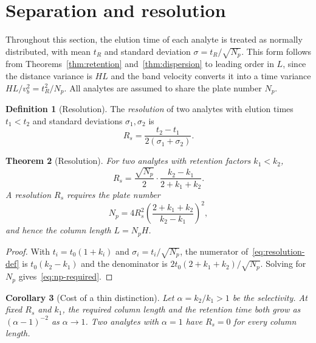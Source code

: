 \documentclass[11pt,a4paper]{article}
\newtheorem{theorem}{Theorem}[section]
\newtheorem{corollary}[theorem]{Corollary}
\theoremstyle{definition}
\newtheorem{definition}[theorem]{Definition}
\theoremstyle{remark}
\begin{document}
\section{Separation and resolution}
\label{sec:separation}

Throughout this section, the elution time of each analyte is treated as normally distributed, with mean $t_R$ and standard deviation $\sigma=t_R/\sqrt{N_p}$.
This form follows from Theorems~\ref{thm:retention} and~\ref{thm:dispersion} to leading order in $L$, since the distance variance is $HL$ and the band velocity converts it into a time variance $HL/v_b^{2}=t_R^{2}/N_p$.
All analytes are assumed to share the plate number $N_p$.

\begin{definition}[Resolution]
\label{def:resolution}
The \emph{resolution} of two analytes with elution times $t_1<t_2$ and standard deviations $\sigma_1,\sigma_2$ is
\begin{equation}
R_s=\frac{t_2-t_1}{2(\sigma_1+\sigma_2)}.
\label{eq:resolution-def}
\end{equation}
\end{definition}

\begin{theorem}[Resolution]
\label{thm:resolution}
For two analytes with retention factors $k_1<k_2$,
\begin{equation}
R_s=\frac{\sqrt{N_p}}{2}\cdot\frac{k_2-k_1}{2+k_1+k_2}.
\label{eq:resolution}
\end{equation}
A resolution $R_s$ requires the plate number
\begin{equation}
N_p=4R_s^{2}\left(\frac{2+k_1+k_2}{k_2-k_1}\right)^{2},
\label{eq:np-required}
\end{equation}
and hence the column length $L=N_pH$.
\end{theorem}

\begin{proof}
With $t_i=t_0(1+k_i)$ and $\sigma_i=t_i/\sqrt{N_p}$, the numerator of~\eqref{eq:resolution-def} is $t_0(k_2-k_1)$ and the denominator is $2t_0(2+k_1+k_2)/\sqrt{N_p}$.
Solving for $N_p$ gives~\eqref{eq:np-required}.
\end{proof}

\begin{corollary}[Cost of a thin distinction]
\label{cor:cost}
Let $\alpha=k_2/k_1>1$ be the \emph{selectivity}.
At fixed $R_s$ and $k_1$, the required column length and the retention time both grow as $(\alpha-1)^{-2}$ as $\alpha\to1$.
Two analytes with $\alpha=1$ have $R_s=0$ for every column length.
\end{corollary}
\end{document}
